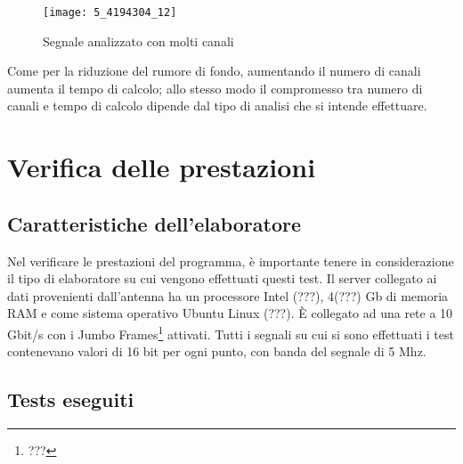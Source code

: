 \begin{figure}[htb]
	\begin{center}
		\texttt{[image: 5\_4194304\_12]}
	\end{center}
	\caption{Segnale analizzato con molti canali}
	\label{fig:high_chans}
\end{figure}

Come per la riduzione del rumore di fondo, aumentando il numero di canali
aumenta il tempo di calcolo; allo stesso modo il compromesso tra numero di
canali e tempo di calcolo dipende dal tipo di analisi che si intende effettuare.

\section{Verifica delle prestazioni}
\subsection{Caratteristiche dell'elaboratore}
Nel verificare le prestazioni del programma, \`e importante tenere in
considerazione il tipo di elaboratore su cui vengono effettuati questi test. Il
server collegato ai dati provenienti dall'antenna ha un processore Intel (???),
4(???) Gb di memoria RAM e come sistema operativo Ubuntu Linux (???). \`E
collegato ad una rete a 10 Gbit/s con i Jumbo Frames\footnote{???} attivati.
Tutti i segnali su cui si sono effettuati i test contenevano valori di 16 bit
per ogni punto, con banda del segnale di 5 Mhz.
\subsection{Tests eseguiti}

